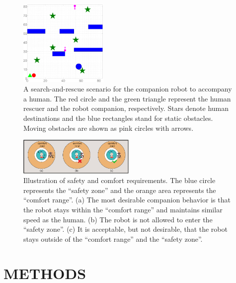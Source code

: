 \documentclass[letterpaper, 10 pt, conference]{ieeeconf}
\begin{document}
	
	\begin{figure}
		\centering		
		\includegraphics[width=0.38\textwidth]{figures/sim_traj_init}		
		\caption{A search-and-rescue scenario for the companion robot to accompany a human. The red circle and the green triangle represent the human rescuer and the robot companion, respectively. Stars denote human destinations and the blue rectangles stand for static obstacles. Moving obstacles are shown as pink circles with arrows.}
		\label{fig:ref_traj_init}
	\end{figure}
	
	\begin{figure}
		\centering		
		\includegraphics[width=0.5\textwidth]{figures/zone}		
		\caption{Illustration of safety and comfort requirements. The blue circle represents the ``safety zone'' and the orange area represents the ``comfort range''. (a) The most desirable companion behavior is that the robot stays within the ``comfort range'' and maintains similar speed as the human. (b) The robot is not allowed to enter the ``safety zone''. (c) It is acceptable, but not desirable, that the robot stays outside of the ``comfort range'' and the ``safety zone''.}
		\label{fig:zone}
	\end{figure}
	
	\section{METHODS} \label{sec:framework}
	
\end{document}
